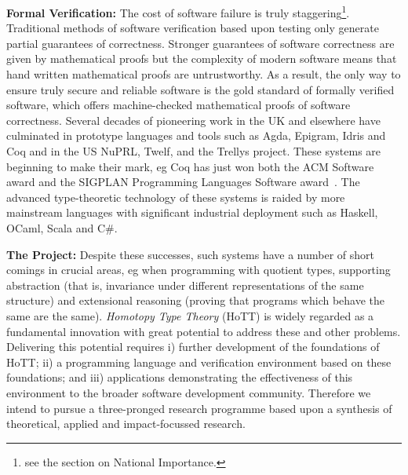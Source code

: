 \documentclass[a4paper,11pt]{article}
\begin{document}
{\bf Formal Verification:} The cost of software failure is truly
staggering\footnote{see the section on National
  Importance.}. Traditional methods of software verification based
upon testing only generate partial guarantees of correctness. Stronger
guarantees of software correctness are given by mathematical proofs
but the complexity of modern software means that hand written
mathematical proofs are untrustworthy. As a result, the only way to
ensure truly secure and reliable software is the gold standard of
formally verified software, which offers machine-checked mathematical
proofs of software correctness. Several decades of pioneering work in
the UK and elsewhere have culminated in prototype languages and tools
such as Agda, Epigram, Idris and Coq and in the US NuPRL, Twelf, and
the Trellys project. These systems are beginning to make their mark,
eg Coq has just won both the ACM Software award and the SIGPLAN
Programming Languages Software award~\cite{}. The advanced
type-theoretic technology of these systems is raided by more
mainstream languages with significant industrial deployment such as
Haskell, OCaml, Scala and C\#.

{\bf The Project:} Despite these successes, such systems have a number
of short comings in crucial areas, eg when programming with quotient
types, supporting abstraction (that is, invariance under different
representations of the same structure) and extensional reasoning
(proving that programs which behave the same are the same).  {\em
  Homotopy Type Theory} (HoTT) is widely regarded as a fundamental
innovation with great potential to address these and other problems.
Delivering this potential requires i) further
development of the foundations of HoTT; ii)
a programming language and verification environment based on
these foundations; and iii) applications demonstrating the effectiveness
of this environment to the broader software development community.
Therefore we intend to pursue a three-pronged
research programme based upon a synthesis of theoretical, applied and
impact-focussed research.


\end{document}
